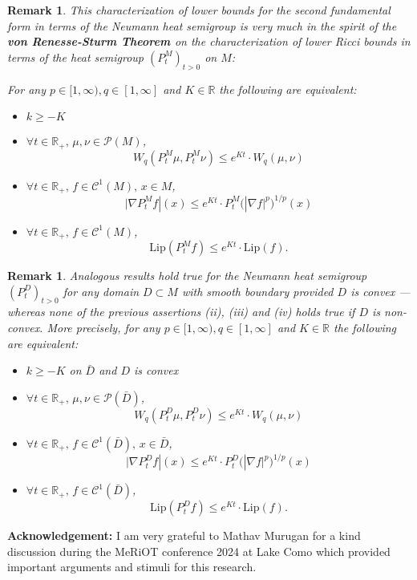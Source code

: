 \documentclass[a4paper,12pt]{article}
\theoremstyle{plain}
\newtheorem{remark}[thm]{Remark}
\def\R{{\mathbb R}}
\def\R{{\mathbb R}}%
\begin{document}
\begin{remark} This characterization of lower bounds for the second fundamental form in terms of the Neumann heat semigroup is very much in the spirit of the {\bf von Renesse-Sturm Theorem \cite{vRS05}}
on the characterization of lower Ricci bounds in terms of the heat semigroup $(P^M_t)_{t>0}$ on $M$:

For any $p\in [1,\infty), q\in [1,\infty]$ and $K\in\R$ the following are equivalent:
\begin{itemize}
\item[(i)] $k\ge -K$
\item[(ii)] $\forall  t\in\R_+, \, \mu,\nu\in\mathcal{P}(M)$,
$$W_q(P^M_t\mu,P^M_t\nu)\le e^{Kt}\cdot W_q(\mu,\nu)$$
\item[(iii)] $\forall  t\in\R_+, \, f\in\mathcal{C}^1(M), \, x\in M$,
$$\big|\nabla P^M_tf|(x)\le e^{Kt}\cdot P^M_t\big(|\nabla f|^p\big)^{1/p}(x)$$
\item[(iv)]
$\forall  t\in\R_+, \, f\in\mathcal{C}^1(M)$,
$$\text{Lip}( P^M_tf)\le e^{Kt}\cdot \text{Lip} (f).$$
\end{itemize}
\end{remark}

\begin{remark} Analogous results hold true for the Neumann heat semigroup  $(P^D_t)_{t>0}$ for any domain $D\subset M$ with smooth boundary provided $D$ is convex --- whereas none of the previous assertions (ii), (iii) and (iv) holds true if $D$ is non-convex.
More precisely, for any $p\in [1,\infty), q\in [1,\infty]$ and $K\in\R$ the following are equivalent:
\begin{itemize}
\item[(i)] $k\ge -K$ on $\bar D$ and $D$ is convex
\item[(ii)] $\forall  t\in\R_+, \, \mu,\nu\in\mathcal{P}(\bar D)$,
$$W_q(P^D_t\mu,P^D_t\nu)\le e^{Kt}\cdot W_q(\mu,\nu)$$
\item[(iii)] $\forall  t\in\R_+, \, f\in\mathcal{C}^1(\bar D), \, x\in \bar D$,
$$\big|\nabla P^D_tf|(x)\le e^{Kt}\cdot P^D_t\big(|\nabla f|^p\big)^{1/p}(x)$$
\item[(iv)]
$\forall  t\in\R_+, \, f\in\mathcal{C}^1(\bar D)$,
$$\text{Lip}( P^D_tf)\le e^{Kt}\cdot \text{Lip} (f).$$
\end{itemize}
\end{remark}

\bigskip

\noindent
{\bf Acknowledgement:} I am very grateful to Mathav Murugan for a kind discussion during the MeRiOT conference 2024 at Lake Como which provided important arguments and stimuli for this research.
\end{document}
